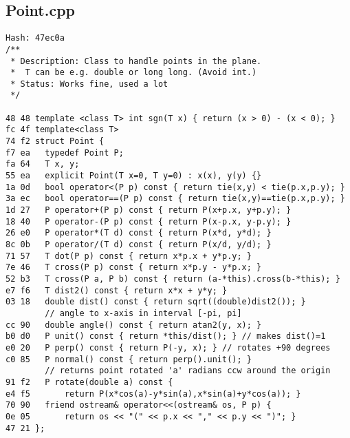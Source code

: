 \documentclass[11pt, a4paper, twoside]{article}
\begin{document}
\subsection{Point.cpp}
\begin{lstlisting}
Hash: 47ec0a
/**
 * Description: Class to handle points in the plane.
 * 	T can be e.g. double or long long. (Avoid int.)
 * Status: Works fine, used a lot
 */

48 48 template <class T> int sgn(T x) { return (x > 0) - (x < 0); }
fc 4f template<class T>
74 f2 struct Point {
f7 ea 	typedef Point P;
fa 64 	T x, y;
55 ea 	explicit Point(T x=0, T y=0) : x(x), y(y) {}
1a 0d 	bool operator<(P p) const { return tie(x,y) < tie(p.x,p.y); }
3a ec 	bool operator==(P p) const { return tie(x,y)==tie(p.x,p.y); }
1d 27 	P operator+(P p) const { return P(x+p.x, y+p.y); }
18 40 	P operator-(P p) const { return P(x-p.x, y-p.y); }
26 e0 	P operator*(T d) const { return P(x*d, y*d); }
8c 0b 	P operator/(T d) const { return P(x/d, y/d); }
71 57 	T dot(P p) const { return x*p.x + y*p.y; }
7e 46 	T cross(P p) const { return x*p.y - y*p.x; }
52 b3 	T cross(P a, P b) const { return (a-*this).cross(b-*this); }
e7 f6 	T dist2() const { return x*x + y*y; }
03 18 	double dist() const { return sqrt((double)dist2()); }
      	// angle to x-axis in interval [-pi, pi]
cc 90 	double angle() const { return atan2(y, x); }
b0 d0 	P unit() const { return *this/dist(); } // makes dist()=1
e0 20 	P perp() const { return P(-y, x); } // rotates +90 degrees
c0 85 	P normal() const { return perp().unit(); }
      	// returns point rotated 'a' radians ccw around the origin
91 f2 	P rotate(double a) const {
e4 f5 		return P(x*cos(a)-y*sin(a),x*sin(a)+y*cos(a)); }
70 90 	friend ostream& operator<<(ostream& os, P p) {
0e 05 		return os << "(" << p.x << "," << p.y << ")"; }
47 21 };
\end{lstlisting}
\end{document}
